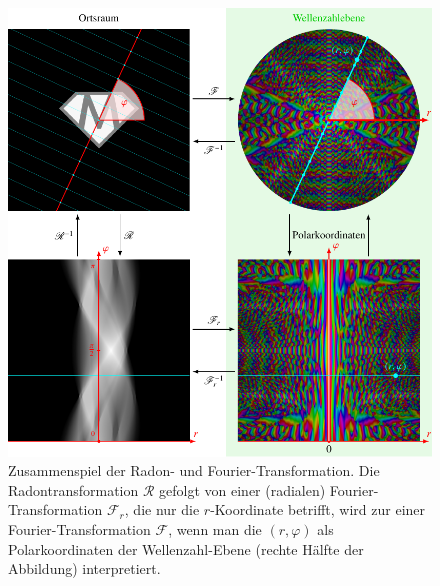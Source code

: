 %
%
%
\begin{figure}
\centering
\includegraphics[width=\textwidth]{chapters/050-radon/images/radonft.pdf}
\caption{Zusammenspiel der Radon- und Fourier-Transformation.
Die Radontransformation $\mathscr{R}$ gefolgt von einer (radialen)
Fourier-Transformation $\mathscr{F}_r$, die nur die $r$-Koordinate
betrifft, wird zur einer Fourier-Transformation $\mathscr{F}$, wenn
man die $(r,\varphi)$ als Polarkoordinaten der Wellenzahl-Ebene
(rechte Hälfte der Abbildung) interpretiert.
\label{buch:gruppen:radon:definition:fig:radonft}}
\end{figure}
